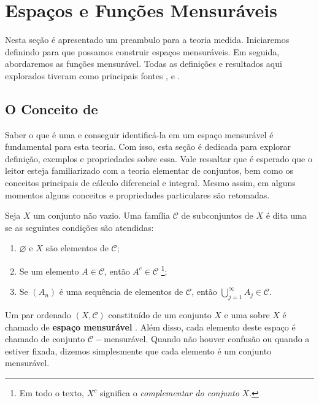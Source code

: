 \chapter{Espaços e Funções Mensuráveis}

Nesta seção é apresentado um preambulo para a teoria medida.
Iniciaremos definindo \sigal para que possamos construir espaços mensuráveis.
Em seguida, abordaremos as funções mensurável.
Todas as definições e resultados aqui explorados tiveram como principais fontes \cite{elon}, \cite{bartle} e \cite{magalhaes}.

\section{O Conceito de \sigal}
Saber o que é uma \sigal e conseguir identificá-la em um espaço mensurável é fundamental para esta teoria.
Com isso, esta seção é dedicada para explorar definição, exemplos e propriedades sobre essa.
Vale ressaltar que é esperado que o leitor esteja familiarizado com a teoria elementar de conjuntos, bem como os conceitos principais de cálculo diferencial e integral.
Mesmo assim, em alguns momentos alguns conceitos e propriedades particulares são retomadas.

\begin{definition}
\label{def:sigma-algebra}

    Seja $X$ um conjunto não vazio. Uma família $\mathcal{C}$ de subconjuntos de $X$ é dita uma \sigal se as seguintes condições são atendidas:
    \begin{enumerate}[label*= (\roman*)]
        \item $\varnothing$ e $X$ são elementos de $\mathcal{C}$;     
        \item Se um elemento $A \in \mathcal{C}$, então $A^c \in \mathcal{C}$
        \footnote{Em todo o texto, $X^c$ significa o \textit{complementar do conjunto} $X$.};
        \item Se $(A_n)$ é uma sequência de elementos de $\mathcal{C}$, 
        então $\displaystyle \bigcup_{j = 1}^\infty A_j \in \mathcal{C}$.
    \end{enumerate}

\end{definition}

Um par ordenado $(X, \mathcal{C})$  constituído de um conjunto $X$ e uma \sigal sobre $X$ é chamado de  \textbf{espaço mensurável} . 
Além disso, cada elemento deste espaço é chamado de conjunto $\mathcal{C}-$mensurável.
Quando não houver confusão ou quando a \sigal estiver fixada, dizemos simplesmente que cada elemento é um conjunto mensurável.

